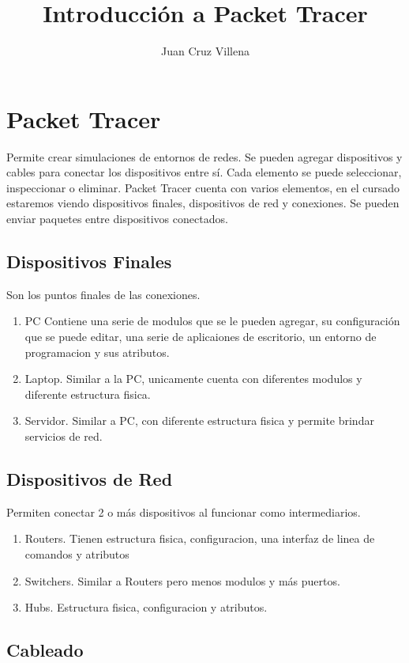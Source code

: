 \documentclass{article}
\title{Introducción a Packet Tracer}
\author{Juan Cruz Villena}
\begin{document}
\maketitle


\section{Packet Tracer}

Permite crear simulaciones de entornos de redes.
Se pueden agregar dispositivos y cables para conectar los dispositivos entre sí.
Cada elemento se puede seleccionar, inspeccionar o eliminar.
Packet Tracer cuenta con varios elementos, en el cursado estaremos viendo dispositivos finales, dispositivos de red y conexiones.
Se pueden enviar paquetes entre dispositivos conectados.

\subsection{Dispositivos Finales}
Son los puntos finales de las conexiones.
\begin{enumerate}
\item PC Contiene una serie de modulos que se le pueden agregar, su configuración que se puede editar, una serie de aplicaiones de escritorio, un entorno de programacion y sus atributos.
\item Laptop. Similar a la PC, unicamente cuenta con diferentes modulos y diferente estructura fisica.
\item Servidor. Similar a PC, con diferente estructura fisica y permite brindar servicios de red.
\end{enumerate}

\subsection{Dispositivos de Red}
Permiten conectar 2 o más dispositivos al funcionar como intermediarios.
\begin{enumerate}
\item Routers. Tienen estructura fisica, configuracion, una interfaz de linea de comandos y atributos
\item Switchers. Similar a Routers pero menos modulos y más puertos.
\item Hubs. Estructura fisica, configuracion y atributos.
\end{enumerate}

\subsection{Cableado}
\end{document}
